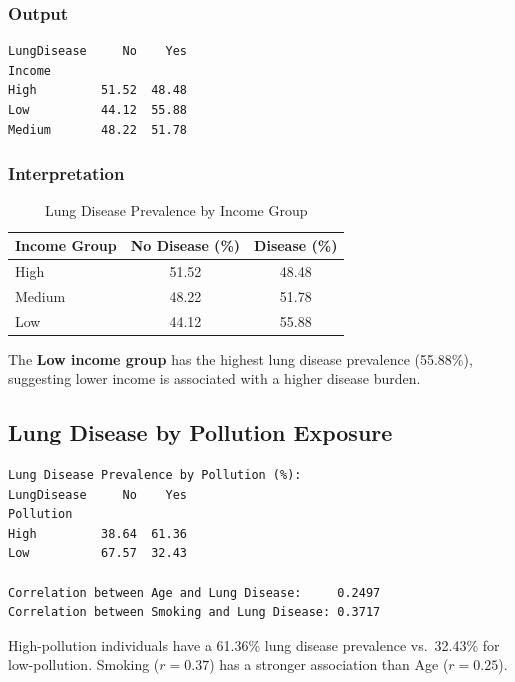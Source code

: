\documentclass[12pt,a4paper]{article}
\begin{document}
\subsubsection{Output}

\begin{lstlisting}[style=outputstyle]
LungDisease     No    Yes
Income
High         51.52  48.48
Low          44.12  55.88
Medium       48.22  51.78
\end{lstlisting}

\subsubsection{Interpretation}

\begin{table}[H]
  \centering
  \caption{Lung Disease Prevalence by Income Group}
  \begin{tabular}{lcc}
    \toprule
    \textbf{Income Group} & \textbf{No Disease (\%)} & \textbf{Disease (\%)} \\
    \midrule
    High   & 51.52 & 48.48 \\
    Medium & 48.22 & 51.78 \\
    Low    & 44.12 & 55.88 \\
    \bottomrule
  \end{tabular}
\end{table}

The \textbf{Low income group} has the highest lung disease prevalence (55.88\%), suggesting lower income is associated with a higher disease burden.

\subsection{Lung Disease by Pollution Exposure}

\begin{lstlisting}[style=outputstyle]
Lung Disease Prevalence by Pollution (%):
LungDisease     No    Yes
Pollution
High         38.64  61.36
Low          67.57  32.43

Correlation between Age and Lung Disease:     0.2497
Correlation between Smoking and Lung Disease: 0.3717
\end{lstlisting}

High-pollution individuals have a 61.36\% lung disease prevalence vs.\ 32.43\% for low-pollution. Smoking ($r=0.37$) has a stronger association than Age ($r=0.25$).
\end{document}
